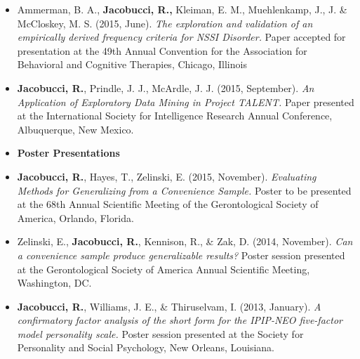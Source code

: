 \documentclass[letterpaper,10pt]{article}
\begin{document}
\begin{itemize}
\item[]Ammerman, B. A., \textbf{Jacobucci, R.,} Kleiman, E. M., Muehlenkamp, J., J. \& McCloskey, M. S. (2015, June). \emph{The exploration and validation of an empirically derived frequency criteria for NSSI Disorder.} Paper accepted for presentation at the 49th Annual Convention for the Association for Behavioral and Cognitive Therapies, Chicago, Illinois
%
\item[] \textbf{Jacobucci, R.}, Prindle, J. J., McArdle, J. J. (2015, September). \emph{An Application of Exploratory Data Mining in Project TALENT.} Paper presented at the International Society for Intelligence Research Annual Conference, Albuquerque, New Mexico.
%
%
%
%
%
%
\item[]{\textbf{\large{Poster Presentations}}}
%
\item[] \textbf{Jacobucci, R.}, Hayes, T., Zelinski, E. (2015, November). \emph{Evaluating Methods for Generalizing from a Convenience Sample.} Poster to be presented at the 68th Annual Scientific Meeting of the Gerontological Society of America, Orlando, Florida.
%
\item[]Zelinski, E., \textbf{Jacobucci, R.}, Kennison, R., \& Zak, D. (2014, November). \emph{Can a convenience sample produce generalizable results?} Poster session presented at the Gerontological Society of America Annual Scientific Meeting, Washington, DC.
%
\item[]\textbf{Jacobucci, R.}, Williams, J. E., \& Thiruselvam, I. (2013, January). \emph{A confirmatory factor analysis of the short form for the IPIP-NEO five-factor model personality scale.} Poster session presented at the Society for Personality and Social Psychology, New Orleans, Louisiana.

\end{itemize}
\end{document}
